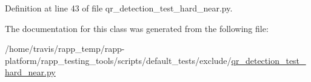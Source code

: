 Definition at line 43 of file qr\-\_\-detection\-\_\-test\-\_\-hard\-\_\-near.\-py.



The documentation for this class was generated from the following file\-:\begin{DoxyCompactItemize}
\item 
/home/travis/rapp\-\_\-temp/rapp-\/platform/rapp\-\_\-testing\-\_\-tools/scripts/default\-\_\-tests/exclude/\hyperlink{qr__detection__test__hard__near_8py}{qr\-\_\-detection\-\_\-test\-\_\-hard\-\_\-near.\-py}\end{DoxyCompactItemize}
